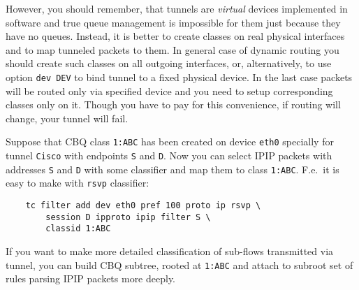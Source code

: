 However, you should remember, that tunnels are {\em virtual} devices
implemented in software and true queue management is impossible for them
just because they have no queues. Instead, it is better to create classes
on real physical interfaces and to map tunneled packets to them.
In general case of dynamic routing you should create such classes
on all outgoing interfaces, or, alternatively,
to use option \verb|dev DEV| to bind tunnel to a fixed physical device.
In the last case packets will be routed only via specified device
and you need to setup corresponding classes only on it.
Though you have to pay for this convenience,
if routing will change, your tunnel will fail.

Suppose that CBQ class \verb|1:ABC| has been created on device \verb|eth0|
specially for tunnel \verb|Cisco| with endpoints \verb|S| and \verb|D|.
Now you can select IPIP packets with addresses \verb|S| and \verb|D|
with some classifier and map them to class \verb|1:ABC|. F.e.\
it is easy to make with \verb|rsvp| classifier:
\begin{verbatim}
    tc filter add dev eth0 pref 100 proto ip rsvp \
        session D ipproto ipip filter S \
        classid 1:ABC
\end{verbatim}

If you want to make more detailed classification of sub-flows
transmitted via tunnel, you can build CBQ subtree,
rooted at \verb|1:ABC| and attach to subroot set of rules parsing
IPIP packets more deeply.



